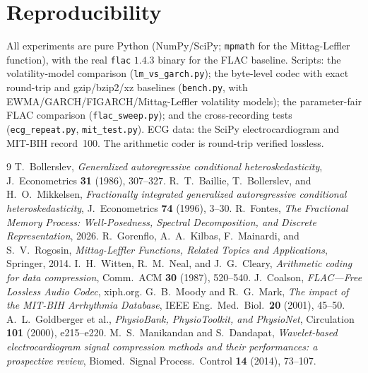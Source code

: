 \documentclass[11pt,reqno]{amsart}
\theoremstyle{plain}
\theoremstyle{remark}
\begin{document}
\section*{Reproducibility}
All experiments are pure Python (NumPy/SciPy; \texttt{mpmath} for the
Mittag-Leffler function), with the real \texttt{flac} $1.4.3$ binary for the FLAC
baseline. Scripts: the volatility-model comparison (\texttt{lm\_vs\_garch.py});
the byte-level codec with exact round-trip and gzip/bzip2/xz baselines
(\texttt{bench.py}, with EWMA/GARCH/FIGARCH/Mittag-Leffler volatility models);
the parameter-fair FLAC comparison (\texttt{flac\_sweep.py}); and the
cross-recording tests (\texttt{ecg\_repeat.py}, \texttt{mit\_test.py}). ECG data:
the SciPy electrocardiogram and MIT-BIH record~100. The arithmetic coder is
round-trip verified lossless.

\begin{thebibliography}{9}
 T.~Bollerslev, \emph{Generalized autoregressive conditional
  heteroskedasticity}, J.\ Econometrics \textbf{31} (1986), 307--327.
 R.~T.~Baillie, T.~Bollerslev, and H.~O.~Mikkelsen,
  \emph{Fractionally integrated generalized autoregressive conditional
  heteroskedasticity}, J.\ Econometrics \textbf{74} (1996), 3--30.
 R.~Fontes, \emph{The Fractional Memory Process: Well-Posedness,
  Spectral Decomposition, and Discrete Representation}, 2026.
 R.~Gorenflo, A.~A.~Kilbas, F.~Mainardi, and S.~V.~Rogosin,
  \emph{Mittag-Leffler Functions, Related Topics and Applications}, Springer,
  2014.
 I.~H.~Witten, R.~M.~Neal, and J.~G.~Cleary, \emph{Arithmetic
  coding for data compression}, Comm.\ ACM \textbf{30} (1987), 520--540.
 J.~Coalson, \emph{FLAC---Free Lossless Audio Codec}, xiph.org.
 G.~B.~Moody and R.~G.~Mark, \emph{The impact of the MIT-BIH
  Arrhythmia Database}, IEEE Eng.\ Med.\ Biol.\ \textbf{20} (2001), 45--50.
 A.~L.~Goldberger et al., \emph{PhysioBank, PhysioToolkit,
  and PhysioNet}, Circulation \textbf{101} (2000), e215--e220.
 M.~S.~Manikandan and S.~Dandapat, \emph{Wavelet-based
  electrocardiogram signal compression methods and their performances: a
  prospective review}, Biomed.\ Signal Process.\ Control \textbf{14} (2014),
  73--107.
\end{thebibliography}
\end{document}
